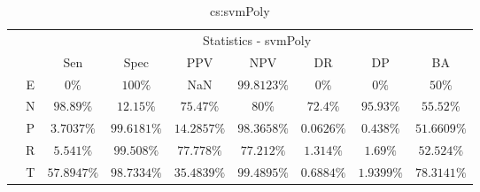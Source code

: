 \begin{table}[!ht]
	\centering
	\begin{tabular}{|c|c|c|c|c|c|c|c|c|}
		\cline{3-9}
		\multicolumn{2}{c|}{} & \multicolumn{7}{c|}{Statistics - svmPoly} \\ \cline{3-9}
		\multicolumn{2}{c|}{} & Sen & Spec & PPV & NPV & DR & DP & BA \\ \hline
		\multirow{5}{*}{\rotatebox{90}{Class}} & E & $0\%$ & $100\%$ & NaN & $99.8123\%$ & $0\%$ & $0\%$ & $50\%$ \\ \cline{2-9}
		 & N & $98.89\%$ & $12.15\%$ & $75.47\%$ & $80\%$ & $72.4\%$ & $95.93\%$ & $55.52\%$ \\ \cline{2-9}
		 & P & $3.7037\%$ & $99.6181\%$ & $14.2857\%$ & $98.3658\%$ & $0.0626\%$ & $0.438\%$ & $51.6609\%$ \\ \cline{2-9}
		 & R & $5.541\%$ & $99.508\%$ & $77.778\%$ & $77.212\%$ & $1.314\%$ & $1.69\%$ & $52.524\%$ \\ \cline{2-9}
		 & T & $57.8947\%$ & $98.7334\%$ & $35.4839\%$ & $99.4895\%$ & $0.6884\%$ & $1.9399\%$ & $78.3141\%$ \\ \hline
	\end{tabular}
	\caption{cs:svmPoly}
	\label{tab:cs:svmPoly}
\end{table}

